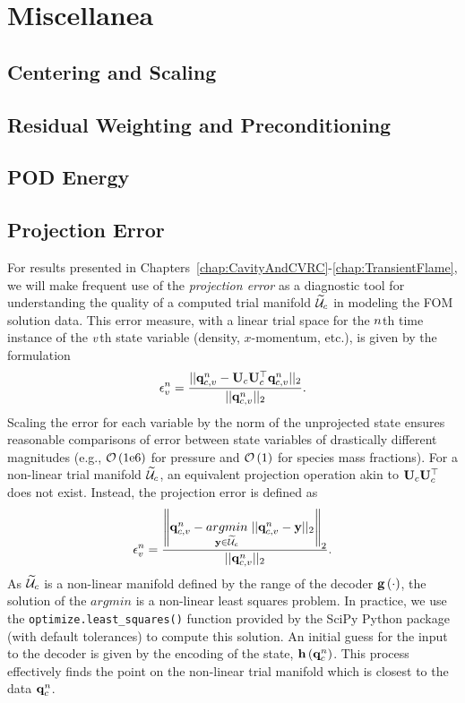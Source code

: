 \section{Miscellanea}

\subsection{Centering and Scaling}\label{subsec:centerScale}

\subsection{Residual Weighting and Preconditioning}\label{subsec:resWeight}

\subsection{POD Energy}

\subsection{Projection Error}\label{subsec:projError}

For results presented in Chapters~\ref{chap:CavityAndCVRC}-\ref{chap:TransientFlame}, we will make frequent use of the \textit{projection error} as a diagnostic tool for understanding the quality of a computed trial manifold $\consTrialSpace$ in modeling the FOM solution data. This error measure, with a linear trial space for the $n$th time instance of the $v$th state variable (density, $x$-momentum, etc.), is given by the formulation
%
\begin{equation}
    \errVecVar^\timeIdx = \frac{|| \consVecVar^\timeIdx - \consTrial \consTrial^\top \consVecVar^\timeIdx ||_2}{|| \consVecVar^\timeIdx ||_2}.
\end{equation}
%
Scaling the error for each variable by the norm of the unprojected state ensures reasonable comparisons of error between state variables of drastically different magnitudes (e.g., $\mathcal{O}\left(1\text{e}6\right)$ for pressure and $\mathcal{O}\left(1\right)$ for species mass fractions). For a non-linear trial manifold $\consTrialSpace$, an equivalent projection operation akin to $\consTrial \consTrial^\top$ does not exist. Instead, the projection error is defined as
%
\begin{equation}
    \errVecVar^\timeIdx = \frac{\left\Vert \consVecVar^\timeIdx - \argmin{\dummyVec \in \consTrialSpace} ||\consVecVar^\timeIdx - \dummyVec||_2 \right\Vert_2}{|| \consVecVar^\timeIdx ||_2}.
\end{equation}
%
As $\consTrialSpace$ is a non-linear manifold defined by the range of the decoder $\mathbf{g} \left(\cdot\right)$, the solution of the $argmin$ is a non-linear least squares problem. In practice, we use the \verb|optimize.least_squares()| function provided by the SciPy Python package (with default tolerances) to compute this solution. An initial guess for the input to the decoder is given by the encoding of the state, $\mathbf{h} \left(\mathbf{q}_{c}^{n}\right)$. This process effectively finds the point on the non-linear trial manifold which is closest to the data $\mathbf{q}_{c}^{n}$.

